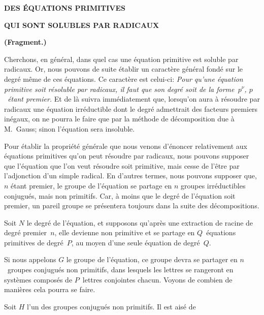 

\begin{center}
{\scriptsize\bfseries DES ÉQUATIONS PRIMITIVES\par}
\vspace{0.45em}
{\scriptsize\bfseries QUI SONT SOLUBLES PAR RADICAUX \GalHistoricalFootnoteMark{*}\par}
\vspace{0.45em}
{\scriptsize\bfseries (Fragment.)\par}
\end{center}

Cherchons, en général, dans quel cas une équation primitive
est soluble par radicaux. Or, nous pouvons de suite établir un
caractère général fondé sur le degré même de ces équations. Ce
caractère est celui-ci: {\itshape Pour qu'une équation primitive soit résoluble
par radicaux, il faut que son degré soit de la forme~$p^{\nu}$, $p$~étant
premier.} Et de là suivra immédiatement que, lorsqu'on aura
à résoudre par radicaux une équation irréductible dont le degré
admettrait des facteurs premiers inégaux, on ne pourra le faire
que par la méthode de décomposition due à M.~Gauss; sinon
l'équation sera insoluble.

Pour établir la propriété générale que nous venons d'énoncer
relativement aux équations primitives qu'on peut résoudre par
radicaux, nous pouvons supposer que l'équation que l'on veut
résoudre soit primitive, mais cesse de l'être par l'adjonction d'un
simple radical. En d'autres termes, nous pouvons supposer que,
$n$ étant premier, le groupe de l'équation se partage en $n$ groupes
irréductibles conjugués, mais non primitifs. Car, à moins que le
degré de l'équation soit premier, un pareil groupe se présentera
toujours dans la suite des décompositions.

Soit $N$ le degré de l'équation, et supposons qu'après une extraction
de racine de degré premier~$n$, elle devienne non primitive et
se partage en $Q$~équations primitives de degré~$P$, au moyen d'une
seule équation de degré~$Q$.

Si nous appelons $G$ le groupe de l'équation, ce groupe devra se
partager en $n$~groupes conjugués non primitifs, dans lesquels les
lettres se rangeront en systèmes composés de $P$~lettres conjointes
chacun. Voyons de combien de manières cela pourra se faire.

Soit $H$ l'un des groupes conjugués non primitifs. Il est aisé de
